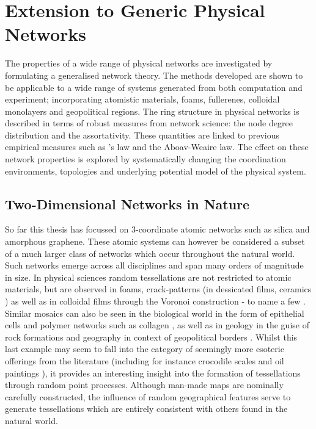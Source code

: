 \chapter[Extension to Generic Physical Networks]{Extension to Generic Physical \\ Networks}
\label{ch:generalnetworks}

\begin{chapterabstract}
The properties of a wide range of physical \td{} networks are investigated by formulating a generalised network theory.
The methods developed are shown to be applicable to a wide range of systems generated from both computation and experiment; incorporating atomistic materials, foams, fullerenes, colloidal monolayers and geopolitical regions.
The ring structure in physical networks is described in terms of robust measures from network science: the node degree distribution and the assortativity.
These quantities are linked to previous empirical measures such as \lm's law and the Aboav\--Weaire law.
The effect on these network properties is explored by systematically changing the coordination environments, topologies and underlying potential model of the physical system.
\end{chapterabstract}

\section{Two\--Dimensional Networks in Nature}

So far this thesis has focussed on 3\--coordinate atomic networks such as silica and amorphous graphene.
These atomic systems can however be considered a subset of a much larger class of \td{} networks which occur throughout the natural world.
Such networks emerge across all disciplines and span many orders of magnitude in size.
In physical sciences random tessellations are not restricted to atomic materials, but are observed in foams, crack\--patterns  (in dessicated films, ceramics \etc) as well as in colloidal films through the Voronoi construction \-- to name a few \cite{Durand2011,Tong2017,Noever1992,Ma2019,Earnshaw1994,Allain1995,Moncho-Jorda2000}.
Similar mosaics can also be seen in the biological world in the form of epithelial cells and polymer networks such as collagen \cite{Honda1978,Carter2017,Kim2016,Broedersz2014}, as well as in geology in the guise of rock formations and geography in context of geopolitical borders \cite{Weaire1984,Goehring2014,LeCaer1993}.
Whilst this last example may seem to fall into the category of seemingly more esoteric offerings from the literature (including for instance crocodile scales and oil paintings \cite{Milinkovitch2019,Flores2017}), it provides an interesting insight into the formation of tessellations through random point processes.
Although man\--made maps are nominally carefully constructed, the influence of random geographical features serve to generate tessellations which are entirely consistent with others found in the natural world.


